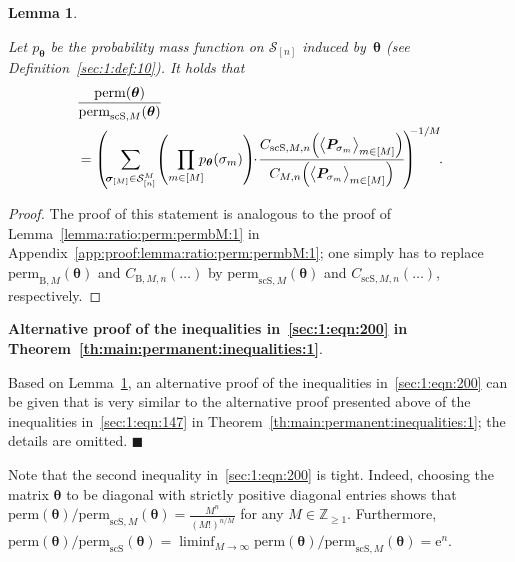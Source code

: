 \documentclass[journal,lettersize,twocolumn]{IEEEtran} %
\renewcommand\qedsymbol{$\blacksquare$}
\newtheorem{lemma}[theorem]{Lemma}
\newcommand{\etheoremproof}{\hfill\qedsymbol}
\newcommand{\set}[1]{\mathcal{#1}}
\newcommand{\sZpp}{\mathbb{Z}_{\geq 1}}
\newcommand{\matr}[1]{ \bm{#1} }
\newcommand{\perm}{ \mathrm{perm} }
\newcommand{\permbM}[1]{\perm_{ \mathrm{B}, #1 }}
\newcommand{\permscs}{ \mathrm{perm}_{\mathrm{scS}} }
\newcommand{\permscsM}[1]{ \mathrm{perm}_{\mathrm{scS},#1} }
\newcommand{\pmtheta}{p_{\mtheta}}
\newcommand{\vsigma}{ \bm{\sigma} }
\newcommand{\setS}{\set{S}}
\newcommand{\CM}[1]{\Cgen{M}{#1}}
\newcommand{\Cgen}[2]{C_{#1,#2}}
\newcommand{\CBM}[1]{\CBgen{M}{#1}}
\newcommand{\CBgen}[2]{C_{\mathrm{B},#1,#2}}
\newcommand{\CscSgen}[2]{C_{\mathrm{scS},#1,#2}}
\newcommand{\mtheta}{\matr{\theta}}
\newcommand{\mP}{\matr{P}}
\newcommand{\e}{\mathrm{e}}
\begin{document}
%

\begin{lemma}
  \label{lemma:ratio:perm:permscM:1}

  Let $\pmtheta$ be the probability mass function on $\setS_{[n]}$ induced
  by~$\mtheta$ (see Definition~\ref{sec:1:def:10}). It holds that
  \begin{align}
    &
    \frac{\perm(\mtheta)}
         {\permscsM{M}(\mtheta)} \nonumber \\
      &= \left( \!
           \sum_{ \vsigma_{[M]} \in \setS_{[n]}^{M} } \!
             \left(
               \prod_{m \in [M]} \!\!\!
                 \pmtheta(\sigma_m)
             \right)
             \!\! \cdot \!
             \frac{\CscSgen{M}{n}
                     \Bigl(
                       \bigl\langle \mP_{\sigma_{m}} \bigr\rangle_{m \in [M]}
                     \Bigr)}
                  {\CM{n}
                     \Bigl(
                       \bigl\langle \mP_{\sigma_{m}} \bigr\rangle_{m \in [M]}
                     \Bigr)} \!
         \right)^{\!\!\! -1/M} \!\! .
           \label{eq:ratio:perm:permscM:1}
  \end{align}
\end{lemma}

%

\begin{proof}
  The proof of this statement is analogous to the proof of
  Lemma~\ref{lemma:ratio:perm:permbM:1} in
  Appendix~\ref{app:proof:lemma:ratio:perm:permbM:1}; one simply has to
  replace $\permbM{M}(\mtheta)$ and $\CBM{n}(\ldots)$ by
  $\permscsM{M}(\mtheta)$ and $\CscSgen{M}{n}(\ldots)$, respectively.
\end{proof}

%

\noindent
\textbf{Alternative proof of the inequalities in~\eqref{sec:1:eqn:200} in
  Theorem~\ref{th:main:permanent:inequalities:1}}.

\noindent
Based on Lemma~\ref{lemma:ratio:perm:permscM:1}, an alternative proof of the
inequalities in~\eqref{sec:1:eqn:200} can be given that is very similar to the
alternative proof presented above of the inequalities in~\eqref{sec:1:eqn:147}
in Theorem~\ref{th:main:permanent:inequalities:1}; the details are omitted.
\etheoremproof

%

\medskip

Note that the second inequality in~\eqref{sec:1:eqn:200} is tight. Indeed,
choosing the matrix $\mtheta$ to be diagonal with strictly positive diagonal
entries shows that
$\perm(\mtheta) / \permscsM{M}(\mtheta) = \frac{M^{n}}{(M!)^{n/M}}$ for any
$M \in \sZpp$. Furthermore,
$\perm(\mtheta) / \permscs(\mtheta) = \liminf_{M \to \infty} \perm(\mtheta) /
\permscsM{M}(\mtheta)= \e^n$.
\end{document}
